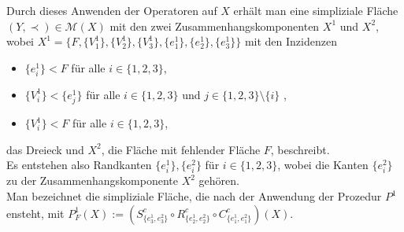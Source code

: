 \documentclass[12pt,titlepage]{article}
\begin{document}
Durch dieses Anwenden der Operatoren auf $X$ erhält man eine simpliziale Fläche $(Y,\prec)\in \mathcal{M}(X)$ mit den zwei Zusammenhangskomponenten $X^{1}$ und $X^{2}$, wobei $X^{1}=\{F,\{V^1_{1}\},\{V^1_{2}\},\{V^1_{3}\},\{e^1_{1}\},\{e^1_{2}\},\{e^1_ {3}\}\}$ mit den Inzidenzen 
\begin{itemize}
 \item $\{e_{i}^1\} < F$ für alle $i \in \{1,2,3\}$,
 \item $\{V_{i}^1\}<\{e_{j}^1\}$ für alle $i \in \{1,2,3\}$ und $j \in \{1,2,3\} \setminus\{i\}$ ,
 \item $\{V_{i}^1\} < F$ für alle $i \in \{1,2,3\}$,
\end{itemize}
das Dreieck und $X^{2}$, die Fläche mit fehlender Fläche $F$, beschreibt.\\
Es entstehen also Randkanten $\{e^1_{i}\},\{e^2_{i}\}$ für $i \in \{1,2,3\}$, wobei die Kanten $\{e^2_{i}\}$ zu der Zusammenhangskomponente $X^2$ gehören. \\
Man bezeichnet die simpliziale Fläche, die nach der Anwendung der Prozedur $P^1$ ensteht, mit \emph{$P_F^1(X):=(S^c_{\{e_3^1,e_3^2\}}\circ R^c_{\{e_2^1,e_2^2\}}\circ C^c_{\{e_1^1,e_1^2\}})(X)$}.

\end{document}
